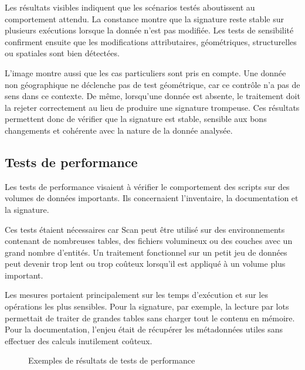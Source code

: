 Les résultats visibles indiquent que les scénarios testés aboutissent au
comportement attendu. La constance montre que la signature reste stable sur
plusieurs exécutions lorsque la donnée n'est pas modifiée. Les tests de
sensibilité confirment ensuite que les modifications attributaires,
géométriques, structurelles ou spatiales sont bien détectées.

L'image montre aussi que les cas particuliers sont pris en compte. Une donnée
non géographique ne déclenche pas de test géométrique, car ce contrôle n'a pas
de sens dans ce contexte. De même, lorsqu'une donnée est absente, le traitement
doit la rejeter correctement au lieu de produire une signature trompeuse. Ces
résultats permettent donc de vérifier que la signature est stable, sensible aux
bons changements et cohérente avec la nature de la donnée analysée.

\subsection{Tests de performance}
\label{subsec:tests_performance_chapitre_4}

Les tests de performance visaient à vérifier le comportement des scripts sur
des volumes de données importants. Ils concernaient l'inventaire, la
documentation et la signature.

Ces tests étaient nécessaires car Scan peut être utilisé sur des environnements
contenant de nombreuses tables, des fichiers volumineux ou des couches avec un
grand nombre d'entités. Un traitement fonctionnel sur un petit jeu de données
peut devenir trop lent ou trop coûteux lorsqu'il est appliqué à un volume plus
important.

Les mesures portaient principalement sur les temps d'exécution et sur les
opérations les plus sensibles. Pour la signature, par exemple, la lecture par
lots permettait de traiter de grandes tables sans charger tout le contenu en
mémoire. Pour la documentation, l'enjeu était de récupérer les métadonnées
utiles sans effectuer des calculs inutilement coûteux.

\begin{figure}[H]
\centering
{}
\caption{Exemples de résultats de tests de performance}
\label{fig:resultats_tests_performance_a_mettre}
\end{figure}

